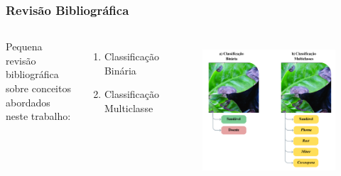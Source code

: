 \documentclass[aspectratio=169]{beamer}
\begin{document}
\begin{frame}
    \frametitle{Revisão Bibliográfica}
    \begin{columns}

        Pequena revisão bibliográfica sobre conceitos abordados neste trabalho:

        \begin{enumerate}
            \item Classificação Binária
            \item Classificação Multiclasse
        \end{enumerate}



        \begin{figure}
            \centering
            \includegraphics[scale = 0.3 ]{img/ClassificacaoX2 (1).png}
            \label{fig:enter-label}
        \end{figure}


    \end{columns}
\end{frame}

\end{document}
